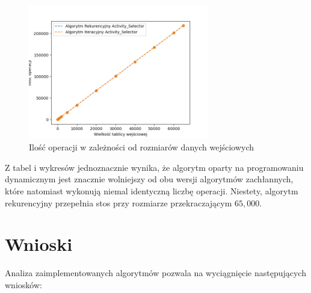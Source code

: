 \documentclass{article}
\begin{document}
\begin{figure}[H]
    \centering
    \includegraphics[width=0.7\textwidth]{Figure_8.png}
    \caption{Ilość operacji w zależności od rozmiarów danych wejściowych}
    \label{fig:as}
\end{figure}
Z tabel i wykresów jednoznacznie wynika, że algorytm oparty na programowaniu dynamicznym jest znacznie wolniejszy od obu wersji algorytmów zachłannych, które natomiast wykonują niemal identyczną liczbę operacji. Niestety, algorytm rekurencyjny przepełnia stos przy rozmiarze przekraczającym $65,000$.
\section{Wnioski}

Analiza zaimplementowanych algorytmów pozwala na wyciągnięcie następujących wniosków:
\end{document}
